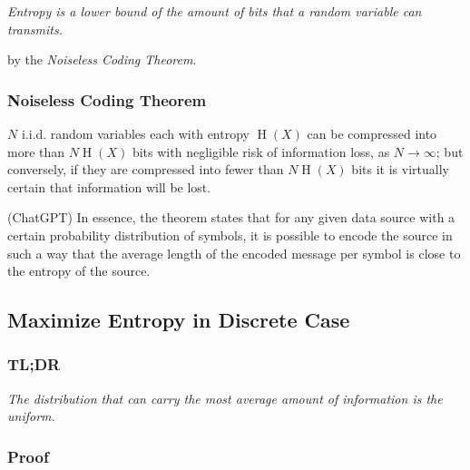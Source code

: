 \documentclass{article}
\begin{document}
                \begin{displayquote}
                    \textit{Entropy is a lower bound of the amount of bits that
                    a random variable can transmits.}
                \end{displayquote}

                by the \textit{Noiseless Coding Theorem}.

            \subsubsection{Noiseless Coding Theorem}

                \begin{displayquote}
                     $ N $ i.i.d. random variables each with entropy $
                     \operatorname{H}(X) $ can be compressed into more than $ N
                     \operatorname{H}(X) $ bits with negligible risk of
                     information loss, as $ N \rightarrow \infty $; but
                     conversely, if they are compressed into fewer than $ N
                     \operatorname{H}(X) $ bits it is virtually certain that
                     information will be lost.
                \end{displayquote}

                (ChatGPT) In essence, the theorem states that for any given
                data source with a certain probability distribution of symbols,
                it is possible to encode the source in such a way that the
                average length of the encoded message per symbol is close to
                the entropy of the source.

        \subsection{Maximize Entropy in Discrete Case}

            \subsubsection*{TL;DR}

                \begin{displayquote}
                    \textit{The distribution that can carry the most average
                    amount of information is the uniform.}
                \end{displayquote}

            \subsubsection*{Proof}
            
\end{document}
